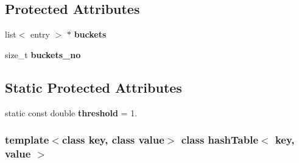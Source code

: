 \subsection*{\-Protected \-Attributes}
\begin{DoxyCompactItemize}
\item 
\hypertarget{classhashTable_a40ac37e352d562d30bff9558ddc9d80d}{list$<$ entry $>$ $\ast$ {\bfseries buckets}}\label{classhashTable_a40ac37e352d562d30bff9558ddc9d80d}

\item 
\hypertarget{classhashTable_a62e87b4eeceeb61af257a1bc6040b34f}{size\-\_\-t {\bfseries buckets\-\_\-no}}\label{classhashTable_a62e87b4eeceeb61af257a1bc6040b34f}

\end{DoxyCompactItemize}
\subsection*{\-Static \-Protected \-Attributes}
\begin{DoxyCompactItemize}
\item 
\hypertarget{classhashTable_a1da624cafaa3ad19671b15eebf8aef32}{static const double {\bfseries threshold} = 1.}\label{classhashTable_a1da624cafaa3ad19671b15eebf8aef32}

\end{DoxyCompactItemize}
\subsubsection*{template$<$class key, class value$>$ class hash\-Table$<$ key, value $>$}




